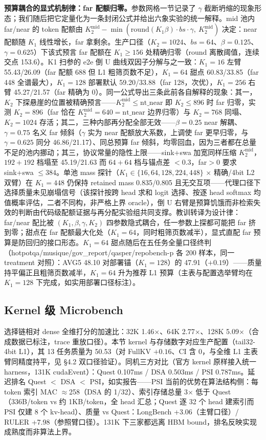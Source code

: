 \documentclass[11pt]{article}
\begin{document}
\textbf{预算耦合的显式机制律：far 配额归零。}参数网格一节记录了 $\gamma$ 截断坍缩的现象形态；我们随后把它定量化为一条封闭公式并给出六象实验的统一解释。mid 池内 far/near 的 token 配额由 $K_2^{\mathrm{mid}} - \min(\mathrm{round}(K_1\beta)\cdot bs\cdot\gamma,\ K_2^{\mathrm{mid}})$ 决定：near 配额随 $K_1$ 线性增长，far 拿剩余。生产口径（$K_2{=}1024$、$bs{=}64$、$\beta{=}0.125$、$\gamma{=}0.625$）下该式预言 far 配额在 $K_1 \geq 156$ 处精确归零（$\mathrm{round}$ 离散阈值，连续交点 153.6）。K1 扫参的 e2e 倒 U 曲线双因子分解与之一致：$K_1{=}16$ 左臂 55.43/26.09（far 配额 688 但 L1 粗筛页数不足），$K_1{=}64$ 甜点 60.83/33.85（far 448 全谱最大），$K_1{=}128$ 部署默认 59.20/33.88（far 128，次优），$K_1{=}256$ 右臂 45.27/21.57（far 精确为 0）。同一公式导出三条此前各自解释的现象：其一，$K_2$ 下探悬崖的位置被精确预言——$K_2^{\mathrm{mid}} \leq \mathrm{nt\_near}$ 即 $K_2 \leq 896$ 时 far 归零，实测 $K_2{=}896$（far 恰在 $K_2^{\mathrm{mid}}{=}640{=}\mathrm{nt\_near}$ 边界归零）与 $K_2{=}768$ 同塌、$K_2{=}1024$ 存活；其二，三种内部再分配全部无效——$\beta{=}0.25$ near 解耦、$\gamma{=}0.75$ 名义 far 倾斜（$\gamma$ 实为 near 配额放大系数，上调使 far 更早归零，与 $\gamma{=}0.625$ 同分 46.86/21.17）、同总预算 far 倾斜，均零回血，因为三者都在总量不足的池内挪动；其三，协议常量的隐性上限——sink+swa 加宽同样压缩 $K_2^{\mathrm{mid}}$，$192{+}192$ 档塌至 45.19/21.63 而 $64{+}64$ 档与锚点差 $<$0.3，far$>$0 要求 sink+swa $\leq 384$。单池 mass 探针（$K_1 \in \{16,64,128,224,448\}$ $\times$ 精确/4bit L2 双臂）在 $K_1{=}448$ 仍保持 retained mass 0.835/0.805 且无交互项——代理口径下选择质量未见崩塌信号（该探针按跨 head 求和 logit 选择、按逐 head softmax 均值概率评估，二者不同构，非严格上界 oracle），倒 U 右臂是预算饥饿而非检索失效的判断由代码级配额证据与再分配实验组共同支撑。教训转译为设计律：far/near 配比被 $(K_1,\beta,\gamma,K_2)$ 四参数隐式耦合，任一参数上探都可能把 far 挤到零；甜点在 far 配额最大化处（$K_1{=}64$，同时粗筛页数减半），显式直配 far 预算是防回归的接口形态。$K_1{=}64$ 甜点随后在五任务全量口径终判（hotpotqa/musique/gov\_report/qasper/repobench-p 各 200 样本，同一 treatment 对照）：AVG5 48.10 对部署锚（$K_1{=}128$）的 47.91（$+0.19$）——质量持平偏正且粗筛页数减半，$K_1{=}64$ 升为推荐 L1 预算（主表与配置选举臂均在 $K_1{=}128$ 下完成，如实用部署口径标注）。

\subsection{Kernel 级 Microbench}

选择链相对 dense 全维打分的加速比：32K 1.46$\times$、64K 2.77$\times$、128K 5.09$\times$（合成数据已标注，trace 重放口径）。本节 kernel 与存储数字对应生产配置（tail32-4bit L1），其 13 任务质量为 50.53（对 FullKV $+0.16$、CI 含 0，与全维 L1 主表臂同精度持平，见 \S4.2 双口径验证）。同机三方对比（官方 kernel 原样接入统一 harness，131K cudaEvent）：Quest 0.107ms / DSA 0.503ms / PSI 0.787ms。延迟排名 Quest $<$ DSA $<$ PSI，如实报告——PSI 当前的优势在算法结构侧：每 token 索引 MAC $\approx$258（DSA 的 1/32）、索引存储总量 3$\times$ 低于 Quest（336B/token vs 约 1KB/token，全 head 汇总；Quest 逐 32 个 head 建索引而 PSI 仅建 8 个 kv-head）、质量 vs Quest：LongBench +3.06（主臂口径）/ RULER +7.98（参照臂口径）。131K 下三家都远离 HBM bound，排名反映实现成熟度而非算法上界。
\end{document}
